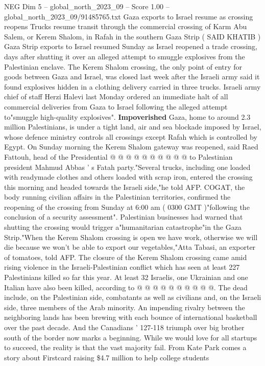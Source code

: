 \begin{textsample}{NEG Dim 5 – global\_north\_2023\_09 – Score 1.00 – global\_north\_2023\_09/91485765.txt}  \label{ex:f5_neg_012}
Gaza exports to Israel resume as crossing reopens Trucks resume transit through the commercial crossing of Karm Abu Salem, or Kerem Shalom, in Rafah in the southern Gaza Strip ( SAID KHATIB ) Gaza Strip exports to Israel resumed Sunday as Israel reopened a trade crossing, days after shutting it over an alleged attempt to smuggle explosives from the Palestinian enclave.
The Kerem Shalom crossing, the only point of entry for goods between Gaza and Israel, was closed last week after the Israeli army said it found explosives hidden in a clothing delivery carried in three trucks.
Israeli army chief of staff Herzi Halevi last Monday ordered an immediate halt of all commercial deliveries from Gaza to Israel following the alleged attempt to"smuggle high-quality explosives". \textbf{Impoverished} Gaza, home to around 2.3 million Palestinians, is under a tight land, air and sea blockade imposed by Israel, whose defence ministry controls all crossings except Rafah which is controlled by Egypt.
On Sunday morning the Kerem Shalom gateway was reopened, said Raed Fattouh, head of the Presidential @ @ @ @ @ @ @ @ @ @ to Palestinian president Mahmud Abbas ' s Fatah party."Several trucks, including one loaded with readymade clothes and others loaded with scrap iron, entered the crossing this morning and headed towards the Israeli side,"he told AFP.
COGAT, the body running civilian affairs in the Palestinian territories, confirmed the reopening of the crossing from Sunday at 6:00 am ( 0300 GMT )"following the conclusion of a security assessment".
Palestinian businesses had warned that shutting the crossing would trigger a"humanitarian catastrophe"in the Gaza Strip."When the Kerem Shalom crossing is open we have work, otherwise we will die because we won't be able to export our vegetables,"Atta Tabasi, an exporter of tomatoes, told AFP.
The closure of the Kerem Shalom crossing came amid rising violence in the Israeli-Palestinian conflict which has seen at least 227 Palestinians killed so far this year.
At least 32 Israelis, one Ukrainian and one Italian have also been killed, according to @ @ @ @ @ @ @ @ @ @.
The dead include, on the Palestinian side, combatants as well as civilians and, on the Israeli side, three members of the Arab minority.
An impending rivalry between the neighboring lands has been brewing with each bounce of international basketball over the past decade.
And the Canadians ' 127-118 triumph over big brother south of the border now marks a beginning.
While we would love for all startups to succeed, the reality is that the vast majority fail.
From Kate Park comes a story about Firstcard raising \$4.7 million to help college students

\end{textsample}
